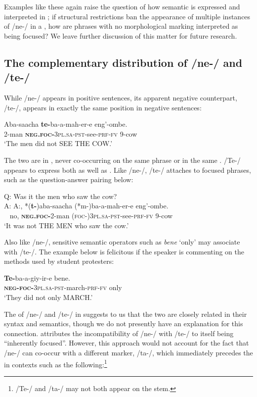 \documentclass[output=paper,modfonts]{langscibook}
\begin{document}
Examples like these again raise the question of how semantic  is expressed and interpreted in ; if structural restrictions ban the appearance of multiple instances of /ne-/ in a , how are phrases with no morphological marking interpreted as being focused? We leave further discussion of this matter for future research.

 
\subsection{The complementary distribution of /ne-/ and /te-/} \label{sec:landmann:6.2}
While /ne-/ appears in positive sentences, its apparent negative counterpart, /te-/, appears in exactly the same position in negative sentences:


\ea\label{ex:landmann:50}
 \gll Aba-saacha \textbf{te-}ba-a-mah-er-e eng’-ombe.\\
     2-man \textsc{\textbf{neg.foc-}}\textsc{3pl}.\textsc{sa}-\textsc{pst}-see-\textsc{prf}-\textsc{fv} 9-cow\\
\glt ‘The men did not SEE THE COW.’
\z

The two are in , never co-occurring on the same phrase or in the same . /Te-/ appears to express both  as well as . Like /ne-/, /te-/ attaches to focused phrases, such as the question-answer pairing below:

\ea\label{ex:landmann:51}
  Q: Was it the men who saw the cow?\\
\gll A: A:, *(\textbf{t-})aba-saacha (*m-)ba-a-mah-er-e eng’-ombe.\\
    ~ no, \textsc{\textbf{neg.foc-}}2-man (\textsc{foc}-)\textsc{3pl}.\textsc{sa}-\textsc{pst}-see-\textsc{prf}-\textsc{fv} 9-cow\\
\glt ‘It was not THE MEN who saw the cow.’
\z

Also like /ne-/,  sensitive semantic operators such as \textit{bene} ‘only’ may associate with /te-/. The example below is felicitous if the speaker is commenting on the methods used by student protesters:

\ea\label{ex:landmann:52}
  \gll \textbf{Te-}ba-a-giy-ir-e bene.\\
     \textsc{\textbf{neg-foc-}}\textsc{3pl}.\textsc{sa}-\textsc{pst}-march-\textsc{prf}-\textsc{fv} only\\
\glt ‘They did not only MARCH.’
\z

The  of /ne-/ and /te-/ in  suggests to us that the two are closely related in their syntax and semantics, though we do not presently have an explanation for this connection. \citet{Mwita2008} attributes the incompatibility of /ne-/ with /te-/ to  itself being “inherently focused”. However, this approach would not account for the fact that /ne-/ can co-occur with a different  marker, /ta-/, which immediately precedes the   in contexts such as the following:\footnote{/Te-/ and /ta-/ may not both appear on the  stem.}
\end{document}
